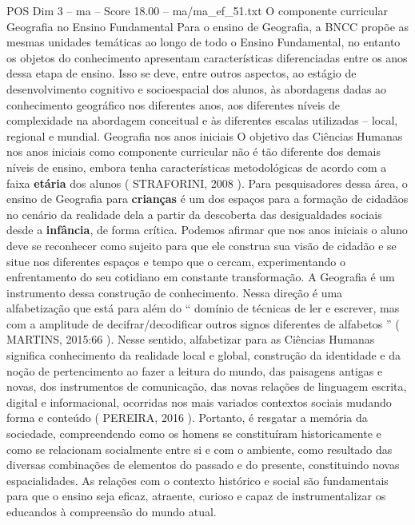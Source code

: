 \begin{textsample}{POS Dim 3 – ma – Score 18.00 – ma/ma\_ef\_51.txt}  \label{ex:f3_pos_147}
O componente curricular Geografia no Ensino Fundamental Para o ensino de Geografia, a BNCC propõe as mesmas unidades temáticas ao longo de todo o Ensino Fundamental, no entanto os objetos do conhecimento apresentam características diferenciadas entre os anos dessa etapa de ensino.
Isso se deve, entre outros aspectos, ao estágio de desenvolvimento cognitivo e socioespacial dos alunos, às abordagens dadas ao conhecimento geográfico nos diferentes anos, aos diferentes níveis de complexidade na abordagem conceitual e às diferentes escalas utilizadas – local, regional e mundial.
Geografia nos anos iniciais O objetivo das Ciências Humanas nos anos iniciais como componente curricular não é tão diferente dos demais níveis de ensino, embora tenha características metodológicas de acordo com a faixa \textbf{etária} dos alunos ( STRAFORINI, 2008 ).
Para pesquisadores dessa área, o ensino de Geografia para \textbf{crianças} é um dos espaços para a formação de cidadãos no cenário da realidade dela a partir da descoberta das desigualdades sociais desde a \textbf{infância}, de forma crítica.
Podemos afirmar que nos anos iniciais o aluno deve se reconhecer como sujeito para que ele construa sua visão de cidadão e se situe nos diferentes espaços e tempo que o cercam, experimentando o enfrentamento do seu cotidiano em constante transformação.
A Geografia é um instrumento dessa construção de conhecimento.
Nessa direção é uma alfabetização que está para além do “ domínio de técnicas de ler e escrever, mas com a amplitude de decifrar/decodificar outros signos diferentes de alfabetos ” ( MARTINS, 2015:66 ).
Nesse sentido, alfabetizar para as Ciências Humanas significa conhecimento da realidade local e global, construção da identidade e da noção de pertencimento ao fazer a leitura do mundo, das paisagens antigas e novas, dos instrumentos de comunicação, das novas relações de linguagem escrita, digital e informacional, ocorridas nos mais variados contextos sociais mudando forma e conteúdo ( PEREIRA, 2016 ).
Portanto, é resgatar a memória da sociedade, compreendendo como os homens se constituíram historicamente e como se relacionam socialmente entre si e com o ambiente, como resultado das diversas combinações de elementos do passado e do presente, constituindo novas espacialidades.
As relações com o contexto histórico e social são fundamentais para que o ensino seja eficaz, atraente, curioso e capaz de instrumentalizar os educandos à compreensão do mundo atual.

\end{textsample}
